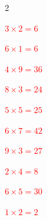 \documentclass[]{exam}
\begin{document}
\begin{questions}

\begin{multicols}{2}
    
\question
\phantom{.}


\ifprintanswers \textcolor{red}{$3 \times 2 = 6$} \fi

\question
\phantom{.}


\ifprintanswers \textcolor{red}{$6 \times 1 = 6$} \fi

\question
\phantom{.}


\ifprintanswers \textcolor{red}{$4 \times 9 = 36$} \fi

\question
\phantom{.}


\ifprintanswers \textcolor{red}{$8 \times 3 = 24$} \fi

\question
\phantom{.}


\ifprintanswers \textcolor{red}{$5 \times 5 = 25$} \fi

\columnbreak

\question
\phantom{.}


\ifprintanswers \textcolor{red}{$6 \times 7 = 42$} \fi

\question
\phantom{.}


\ifprintanswers \textcolor{red}{$9 \times 3 = 27$} \fi

\question
\phantom{.}


\ifprintanswers \textcolor{red}{$2 \times 4 = 8$} \fi

\question
\phantom{.}


\ifprintanswers \textcolor{red}{$6 \times 5 = 30$} \fi

\question
\phantom{.}


\ifprintanswers \textcolor{red}{$1 \times 2 = 2$} \fi

\end{multicols}
\end{questions}
\end{document}
